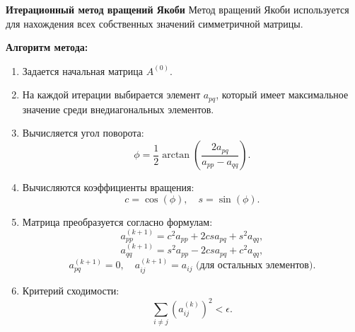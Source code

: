 \documentclass[a4paper, 12pt]{report}
\begin{document}
\textbf{Итерационный метод вращений Якоби}
Метод вращений Якоби используется для нахождения всех собственных значений симметричной матрицы.

\textbf{Алгоритм метода:}  
\begin{enumerate}
    \item Задается начальная матрица $A^{(0)}$.
    \item На каждой итерации выбирается элемент $a_{pq}$, который имеет максимальное значение среди внедиагональных элементов.
    \item Вычисляется угол поворота:
    \[
    \phi = \frac{1}{2} \arctan\left(\frac{2a_{pq}}{a_{pp} - a_{qq}}\right).
    \]
    \item Вычисляются коэффициенты вращения:
    \[
    c = \cos(\phi), \quad s = \sin(\phi).
    \]
    \item Матрица преобразуется согласно формулам:
    \[
    a_{pp}^{(k+1)} = c^2 a_{pp} + 2cs a_{pq} + s^2 a_{qq},
    \]
    \[
    a_{qq}^{(k+1)} = s^2 a_{pp} - 2cs a_{pq} + c^2 a_{qq},
    \]
    \[
    a_{pq}^{(k+1)} = 0, \quad a_{ij}^{(k+1)} = a_{ij} \text{ (для остальных элементов)}.
    \]
    \item Критерий сходимости:
    \[
    \sum_{i \neq j} (a_{ij}^{(k)})^2 < \epsilon.
    \]
\end{enumerate}
\end{document}
